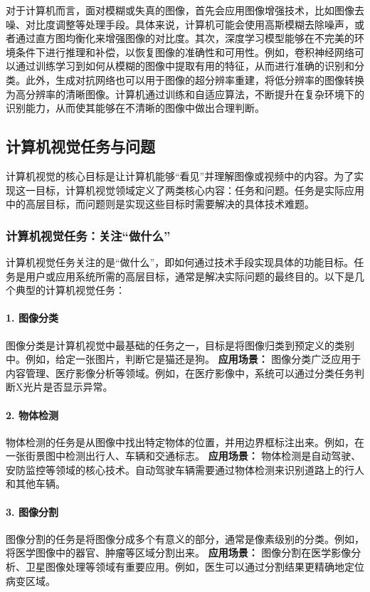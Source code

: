 \begin{itemize}
    对于计算机而言，面对模糊或失真的图像，首先会应用图像增强技术，比如图像去噪、对比度调整等处理手段。具体来说，计算机可能会使用高斯模糊去除噪声，或者通过直方图均衡化来增强图像的对比度。其次，深度学习模型能够在不完美的环境条件下进行推理和补偿，以恢复图像的准确性和可用性。例如，卷积神经网络可以通过训练学习到如何从模糊的图像中提取有用的特征，从而进行准确的识别和分类。此外，生成对抗网络也可以用于图像的超分辨率重建，将低分辨率的图像转换为高分辨率的清晰图像。计算机通过训练和自适应算法，不断提升在复杂环境下的识别能力，从而使其能够在不清晰的图像中做出合理判断。

\end{itemize}

\subsection{计算机视觉任务与问题}

计算机视觉的核心目标是让计算机能够“看见”并理解图像或视频中的内容。为了实现这一目标，计算机视觉领域定义了两类核心内容：任务和问题。任务是实际应用中的高层目标，而问题则是实现这些目标时需要解决的具体技术难题。

\subsubsection{计算机视觉任务：关注“做什么”}

计算机视觉任务关注的是“做什么”，即如何通过技术手段实现具体的功能目标。任务是用户或应用系统所需的高层目标，通常是解决实际问题的最终目的。以下是几个典型的计算机视觉任务：

\paragraph{1. 图像分类}
图像分类是计算机视觉中最基础的任务之一，目标是将图像归类到预定义的类别中。例如，给定一张图片，判断它是猫还是狗。  
\textbf{应用场景：} 图像分类广泛应用于内容管理、医疗影像分析等领域。例如，在医疗影像中，系统可以通过分类任务判断X光片是否显示异常。

\paragraph{2. 物体检测}
物体检测的任务是从图像中找出特定物体的位置，并用边界框标注出来。例如，在一张街景图中检测出行人、车辆和交通标志。  
\textbf{应用场景：} 物体检测是自动驾驶、安防监控等领域的核心技术。自动驾驶车辆需要通过物体检测来识别道路上的行人和其他车辆。

\paragraph{3. 图像分割}
图像分割的任务是将图像分成多个有意义的部分，通常是像素级别的分类。例如，将医学图像中的器官、肿瘤等区域分割出来。  
\textbf{应用场景：} 图像分割在医学影像分析、卫星图像处理等领域有重要应用。例如，医生可以通过分割结果更精确地定位病变区域。

